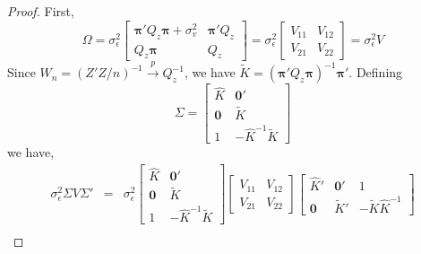\documentclass[12pt]{article}\usepackage[]{graphicx}\usepackage[]{color}
\theoremstyle{definition}
\begin{document}
\begin{proof}
First,
$$\Omega = \sigma_\epsilon^2\left[ \begin{array}{cc}
\boldsymbol{\pi}'Q_z \boldsymbol{\pi}  +\sigma^2_v 
&\boldsymbol{\pi}'Q_z\\
  Q_z \boldsymbol{\pi}&Q_z
  \end{array}\right] = \sigma_\epsilon^2\left[
  \begin{array}{cc}
  V_{11} & V_{12} \\ V_{21} & V_{22}
  \end{array}
  \right]=\sigma_\epsilon^2 V$$
  Since $W_n = (Z'Z/n)^{-1}\overset{p}{\rightarrow} Q_z^{-1}$, we have $\widetilde{K} = \left(\boldsymbol{\pi}'Q_z \boldsymbol{\pi}\right)^{-1}\boldsymbol{\pi}'$. 
Defining
  $$\Sigma = \left[\begin{array}{cc}
\widehat{K} & \mathbf{0}'\\
  \mathbf{0} & \widetilde{K}\\
  1 & -\widehat{K}^{-1} \widetilde{K}
  \end{array}
  \right]$$
we have,
  \begin{eqnarray*}
    \sigma_\epsilon^2 \Sigma V \Sigma' &=&
    \sigma_\epsilon^2 
    \left[\begin{array}{cc}
\widehat{K} & \mathbf{0}'\\
  \mathbf{0} & \widetilde{K}\\
  1 & -\widehat{K}^{-1} \widetilde{K}
  \end{array}
  \right]
    \left[
  \begin{array}{cc}
  V_{11} & V_{12} \\ V_{21} & V_{22}
  \end{array}
  \right]
    \left[
    \begin{array}{ccc}
      \widehat{K}'& \mathbf{0}' &1 \\ 
      \mathbf{0}&\widetilde{K}' &-\widetilde{K}\widehat{K}^{-1}
    \end{array}
    \right]\\

\end{eqnarray*}
\end{proof}
\end{document}
